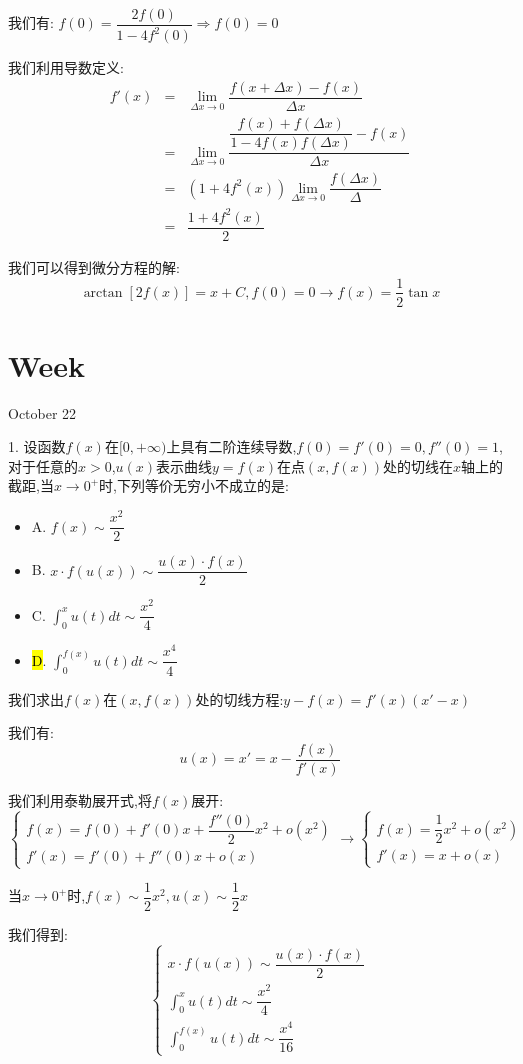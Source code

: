 \begin{solution}

	我们有:  $f(0)=\dfrac{2f(0)}{1-4f^2(0)}\Rightarrow f(0)=0$
	
	我们利用导数定义:  
	\begin{eqnarray*}
		f'(x)&=&\lim\limits_{\Delta x\to 0}\dfrac{f(x+\Delta x)-f(x)}{\Delta x}\\
		&=&\lim\limits_{\Delta x\to 0}\dfrac{\dfrac{f(x)+f(\Delta x)}{1-4f(x)f(\Delta x)}-f(x)}{\Delta x}\\
		&=&(1+4f^{2}(x))\lim\limits_{\Delta x\to 0}\dfrac{f(\Delta x)}{\Delta}\\
		&=&\dfrac{1+4f^{2}(x)}{2}
	\end{eqnarray*}
	
	我们可以得到微分方程的解:  
	$$\arctan[2f(x)]=x+C,f(0)=0\to f(x)=\dfrac{1}{2}\tan x$$
\end{solution}


\section{Week }
\textcolor{purplea}{October 22}

1. 设函数$f(x)$在$[0,+\infty)$上具有二阶连续导数,$f(0)=f'(0)=0,f''(0)=1$,对于任意的$x>0$,$u(x)$表示曲线$y=f(x)$在点$(x,f(x))$处的切线在$x$轴上的截距,当$x\to 0^{+}$时,下列等价无穷小不成立的是:  
\begin{itemize}
	\item A. $f(x)\sim \dfrac{x^2}{2}$
	\item B. $x\cdot f(u(x))\sim \dfrac{u(x)\cdot f(x)}{2}$
	\item C. $\int_{0}^{x}u(t)dt\sim \dfrac{x^2}{4}$
	\item \hl{D}. $\int_{0}^{f(x)}u(t)dt\sim \dfrac{x^4}{4}$
\end{itemize}

\begin{solution}

	我们求出$f(x)$在$(x,f(x))$处的切线方程:$y-f(x)=f'(x)(x'-x)$
	
	我们有:
	$$u(x)=x'=x-\dfrac{f(x)}{f'(x)}$$
	
	我们利用泰勒展开式,将$f(x)$展开:
	$$\left\lbrace 
	\begin{array}{l}
		f(x)=f(0)+f'(0)x+\dfrac{f''(0)}{2}x^2+o(x^2)\\
		f'(x)=f'(0)+f''(0)x+o(x)
	\end{array}
	\right. \to \left\lbrace 
	\begin{array}{l}
		f(x)=\dfrac{1}{2}x^2+o(x^2)\\
		f'(x)=x+o(x)
	\end{array}
	\right. $$
	
	当$x\to 0^{+}$时,$f(x)\sim \dfrac{1}{2}x^2,u(x)\sim \dfrac{1}{2}x$
	
	我们得到:
	$$\left\lbrace 
	\begin{array}{l}
		x\cdot f(u(x))\sim \dfrac{u(x)\cdot f(x)}{2}\\
		\int_{0}^{x}u(t)dt\sim \dfrac{x^2}{4}\\
		\int_{0}^{f(x)}u(t)dt\sim \dfrac{x^4}{16}
	\end{array}
	\right. $$
\end{solution}


